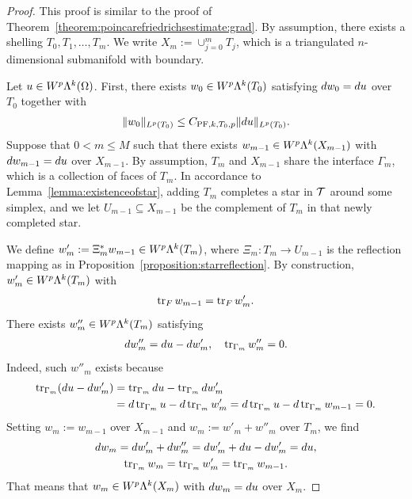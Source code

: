 \documentclass[10pt,a4paper]{article}
\begin{document}
\begin{proof}
    This proof is similar to the proof of Theorem~\ref{theorem:poincarefriedrichsestimate:grad}.
    By assumption, there exists a shelling $T_0, T_1, \dots, T_m$. 
    We write $X_m := \cup_{j=0}^{m} T_j$, which is a triangulated $n$-dimensional submanifold with boundary.

    Let $u \in W^{p}\Lambda^{k}(\Omega)$. 
    First, there exists $w_0 \in W^{p}\Lambda^{k}(T_{0})$ satisfying $d w_0 = d u$ over $T_{0}$ together with 
    \begin{gather*}
        \| w_0 \|_{L^{p}(T_{0})} \leq C_{{{\rm PF}},k,T_{0},p} \| d u \|_{L^{p}(T_{0})}.
    \end{gather*}
    Suppose that $0 < m \leq M$ such that there exists $w_{m-1} \in W^{p}\Lambda^{k}(X_{m-1})$ 
    with $d w_{m-1} = d u$ over $X_{m-1}$. 
    By assumption, $T_{m}$ and $X_{m-1}$ share the interface $\Gamma_{m}$, which is a collection of faces of $T_{m}$. 
    In accordance to Lemma~\ref{lemma:existenceofstar}, adding $T_{m}$ completes a star in ${\mathcal T}$ around some simplex, and we let $U_{m-1} \subseteq X_{m-1}$ be the complement of $T_{m}$ in that newly completed star. 
    
    We define $w'_{m} :=  \Xi_{m}^{\ast} w_{m-1} \in W^{p}\Lambda^{k}(T_{m})$,
    where $\Xi_{m} : T_{m} \rightarrow U_{m-1}$ is the reflection mapping
    as in Proposition~\ref{proposition:starreflection}. 
    By construction, $w'_{m} \in W^{p}\Lambda^{k}(T_{m})$ with 
    \begin{align*}
        \operatorname{tr}_F w_{m-1} = \operatorname{tr}_F w'_{m}
        . 
    \end{align*}
    There exists $w''_{m} \in W^{p}\Lambda^{k}(T_{m})$ satisfying 
    \begin{align*}
        d w''_{m} = d u - d w'_{m}, 
        \quad 
        \operatorname{tr}_{\Gamma_{m}} w''_{m} = 0.
    \end{align*}
    Indeed, such $w''_{m}$ exists because 
    \begin{align*}
        \operatorname{tr}_{\Gamma_{m}}( d u - d w'_{m} ) 
        &= 
        \operatorname{tr}_{\Gamma_{m}} d u - \operatorname{tr}_{\Gamma_{m}} d w'_{m}
        \\&= 
        d \operatorname{tr}_{\Gamma_{m}} u - d \operatorname{tr}_{\Gamma_{m}} w'_{m}
        = 
        d \operatorname{tr}_{\Gamma_{m}} u - d \operatorname{tr}_{\Gamma_{m}} w_{m-1}
        = 
        0
        .
    \end{align*}
    Setting $w_{m} := w_{m-1}$ over $X_{m-1}$ and $w_{m} := w'_{m} + w''_{m}$ over $T_{m}$, 
    we find 
    \begin{gather*}
        d w_{m} = d w'_{m} + d w''_{m} = d w'_{m} + d u - d w'_{m} = d u,
        \\
        \operatorname{tr}_{\Gamma_{m}} w_{m} = \operatorname{tr}_{\Gamma_{m}} w'_{m} = \operatorname{tr}_{\Gamma_{m}} w_{m-1}.
    \end{gather*}
    That means that $w_{m} \in W^{p}\Lambda^{k}(X_{m})$ with $d w_{m} = d u$ over $X_{m}$. 
    

\end{proof}
\end{document}

